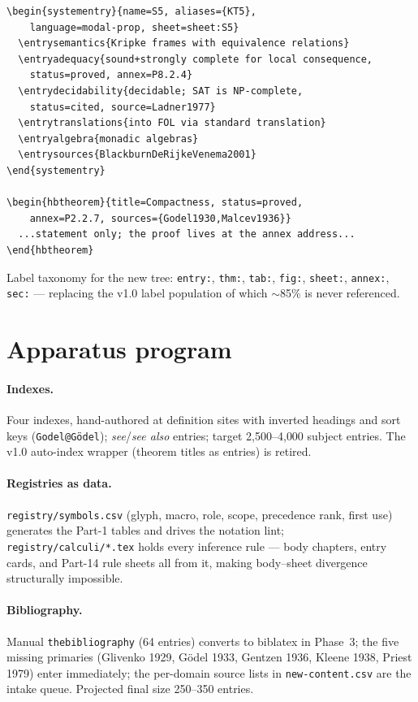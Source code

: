 \documentclass[11pt,letterpaper]{article}
\begin{document}
\begin{lstlisting}
\begin{systementry}{name=S5, aliases={KT5},
    language=modal-prop, sheet=sheet:S5}
  \entrysemantics{Kripke frames with equivalence relations}
  \entryadequacy{sound+strongly complete for local consequence,
    status=proved, annex=P8.2.4}
  \entrydecidability{decidable; SAT is NP-complete,
    status=cited, source=Ladner1977}
  \entrytranslations{into FOL via standard translation}
  \entryalgebra{monadic algebras}
  \entrysources{BlackburnDeRijkeVenema2001}
\end{systementry}

\begin{hbtheorem}{title=Compactness, status=proved,
    annex=P2.2.7, sources={Godel1930,Malcev1936}}
  ...statement only; the proof lives at the annex address...
\end{hbtheorem}
\end{lstlisting}

Label taxonomy for the new tree: \texttt{entry:}, \texttt{thm:},
\texttt{tab:}, \texttt{fig:}, \texttt{sheet:}, \texttt{annex:},
\texttt{sec:} --- replacing the v1.0 label population of which
$\sim$85\% is never referenced.

\section{Apparatus program}
\label{sec:apparatus}

\paragraph{Indexes.}
Four indexes, hand-authored at definition sites with inverted headings
and sort keys (\texttt{Godel@G\"odel}); \emph{see}/\emph{see also}
entries; target 2{,}500--4{,}000 subject entries.  The v1.0 auto-index
wrapper (theorem titles as entries) is retired.

\paragraph{Registries as data.}
\texttt{registry/symbols.csv} (glyph, macro, role, scope, precedence
rank, first use) generates the Part-1 tables and drives the notation
lint; \texttt{registry/calculi/*.tex} holds every inference rule ---
body chapters, entry cards, and Part-14 rule sheets all \verb||
from it, making body--sheet divergence structurally impossible.

\paragraph{Bibliography.}
Manual \texttt{thebibliography} (64 entries) converts to biblatex in
Phase~3; the five missing primaries (Glivenko 1929, G\"odel 1933,
Gentzen 1936, Kleene 1938, Priest 1979) enter immediately; the
per-domain source lists in \texttt{new-content.csv} are the intake
queue.  Projected final size 250--350 entries.
\end{document}
